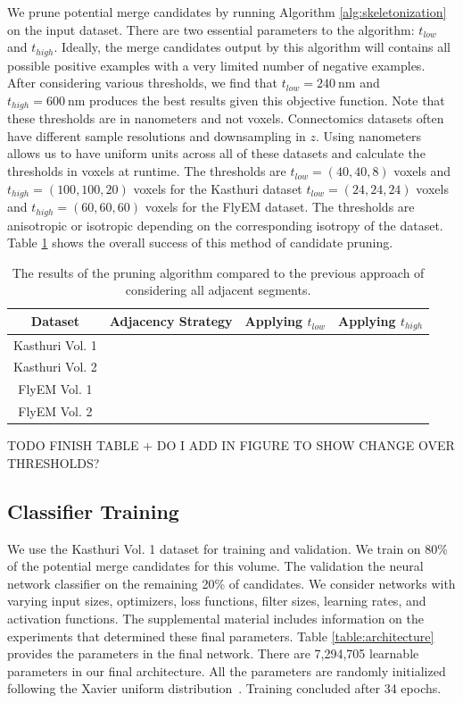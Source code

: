 We prune potential merge candidates by running Algorithm \ref{alg:skeletonization} on the input dataset. 
There are two essential parameters to the algorithm: $t_{low}$ and $t_{high}$. 
Ideally, the merge candidates output by this algorithm will contains all possible positive examples with a very limited number of negative examples. 
After considering various thresholds, we find that $t_{low} = \SI{240}{\nano\meter}$ and $t_{high} = \SI{600}{\nano\meter}$ produces the best results given this objective function. 
Note that these thresholds are in nanometers and not voxels. 
Connectomics datasets often have different sample resolutions and downsampling in $z$. 
Using nanometers allows us to have uniform units across all of these datasets and calculate the thresholds in voxels at runtime. 
The thresholds are $t_{low} = (40, 40, 8)$ voxels and $t_{high} = (100, 100, 20)$ voxels for the Kasthuri dataset $t_{low} = (24, 24, 24)$ voxels and $t_{high} = (60, 60, 60)$ voxels for the FlyEM dataset.
The thresholds are anisotropic or isotropic depending on the corresponding isotropy of the dataset.
Table \ref{table:skeletonization} shows the overall success of this method of candidate pruning.

\begin{table}
	\centering
	\begin{tabular}{c c c c}
		Dataset & Adjacency Strategy & Applying $t_{low}$ & Applying $t_{high}$ \\ \hline
		Kasthuri Vol. 1 & & & \\
		Kasthuri Vol. 2 & & & \\
		FlyEM Vol. 1 & & & \\
		FlyEM Vol. 2 & & & 
	\end{tabular}
	\caption{The results of the pruning algorithm compared to the previous approach of considering all adjacent segments.}
	\label{table:skeletonization}
\end{table}

TODO FINISH TABLE + DO I ADD IN FIGURE TO SHOW CHANGE OVER THRESHOLDS?


\subsection{Classifier Training}

We use the Kasthuri Vol. 1 dataset for training and validation. 
We train on 80\% of the potential merge candidates for this volume.
The validation the neural network classifier on the remaining 20\% of candidates. 
We consider networks with varying input sizes, optimizers, loss functions, filter sizes, learning rates, and activation functions. 
The supplemental material includes information on the experiments that determined these final parameters. 
Table \ref{table:architecture} provides the parameters in the final network.
There are 7,294,705 learnable parameters in our final architecture.
All the parameters are randomly initialized following the Xavier uniform distribution~\cite{glorot2010understanding}. 
Training concluded after 34 epochs. 

